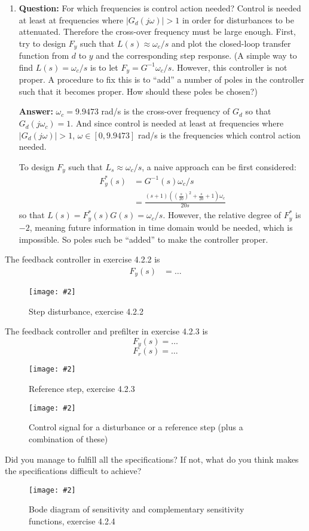 \documentclass[11pt,a4paper]{article}
\newcommand{\image}[3]{
	\begin{figure}[!ht]
		\centering
	    \texttt{[image: \#2]}
		\caption{#3}
		\label{fig:#2}
	\end{figure}
}
\begin{document}
\begin{enumerate}
	\item \textbf{Question:} For which frequencies is control action needed? Control is needed at least at frequencies where $\vert G_{d}(j\omega) \vert > 1$ in order for disturbances to be attenuated. Therefore the cross-over frequency must be large enough. First, try to design $F_{y}$ such that $L(s) \approx \omega_{c} / s$ and plot the closed-loop transfer function from $d$ to $y$ and the corresponding step response. (A simple way to find $L(s) = \omega_{c} / s$ is to let $F_{y} = G^{-1} \omega_{c} / s$. However, this controller is not proper. A procedure to fix this is to ``add'' a number of poles in the controller such that it becomes proper. How should these poles be chosen?)
	\par \textbf{Answer:} $\omega_{c} = 9.9473$ rad/s is the cross-over frequency of $G_{d}$ so that $G_{d}(j\omega_{c}) = 1$. And since control is needed at least at frequencies where $\vert G_{d}(j\omega) \vert > 1$, $\omega \in [0, 9.9473]$ rad/s is the frequencies which control action needed.
	\par To design $F_{y}$ such that $L_{s} \approx \omega_{c} / s$, a naive approach can be first considered:
	\begin{align*}
		F_{y}^{*}(s) &= G^{-1}(s) \omega_{c} / s \\
		&= \frac{(s+1)((\frac{s}{20})^{2}+\frac{s}{20}+1)\omega_{c}}{20s}
	\end{align*}
	so that $L(s) = F_{y}^{*}(s) G(s) = \omega_{c} / s$. However, the relative degree of $F_{y}^{*}$ is $-2$, meaning future information in time domain would be needed, which is impossible. So poles such be ``added'' to make the controller proper.
\end{enumerate}

\par The feedback controller in exercise 4.2.2 is
\begin{align*}
	F_{y}(s) &= \ldots
\end{align*}

	\image{0.5}{system}{Step disturbance, exercise 4.2.2}
	
	The feedback controller and prefilter in exercise 4.2.3 is 
	\[
	F_y(s) = \ldots
	\]
	\[
	F_r(s) = \ldots
	\]
	\image{0.25}{system}{Reference step, exercise 4.2.3}
	\image{0.25}{system}{Control signal for a disturbance or a reference step (plus a combination of these)}

	Did you manage to fulfill all the specifications? If not, what do you think makes the specifications difficult to achieve?
	\par\dotfill\par\dotfill\par
	
	\image{0.25}{system}{Bode diagram of sensitivity and complementary sensitivity functions, exercise 4.2.4}
\end{document}
